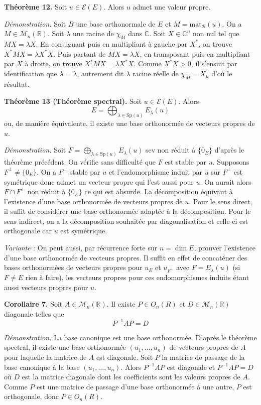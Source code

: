 \textbf{Théorème 12.} Soit $u \in \mathcal{E}(E)$. Alors $u$ admet une valeur propre.

\textit{Démonstration.} Soit $B$ une base orthonormale de $E$ et $M = \text{mat}_{\mathcal{B}}(u)$. On a $M \in \mathcal{M}_n(\mathbb{R})$. Soit $\lambda$ une racine de $\chi_M$ dans $\mathbb{C}$. Soit $X \in \mathbb{C}^n$ non nul tel que $MX = \lambda X$. En conjuguant puis en multipliant à gauche par $X^*$, on trouve $X^*MX = \lambda X^*X$. Puis partant de $MX = \lambda X$, en transposant puis en multipliant par $X$ à droite, on trouve $X^*MX = \lambda X^*X$. Comme $X^*X > 0$, il s'ensuit par identification que $\lambda = \lambda$, autrement dit $\lambda$ racine réelle de $\chi_M = X_\mu$ d'où le résultat.

\textbf{Théorème 13 (Théorème spectral).} Soit $u \in \mathcal{E}(E)$. Alors
\[
E = \bigoplus_{\lambda \in \text{Sp}(u)} E_\lambda(u)
\]
ou, de manière équivalente, il existe une base orthonormée de vecteurs propres de $u$.

\textit{Démonstration.} Soit $F = \bigoplus_{\lambda \in \text{Sp}(u)} E_\lambda(u)$ sev non réduit à $\{0_E\}$ d'après le théorème précédent. On vérifie sans difficulté que $F$ est stable par $u$. Supposons $F^\perp \neq \{0_E\}$. On a $F^\perp$ stable par $u$ et l'endomorphisme induit par $u$ sur $F^\perp$ est symétrique donc admet un vecteur propre qui l'est aussi pour $u$. On aurait alors $F \cap F^\perp$ non réduit à $\{0_E\}$ ce qui est absurde. La décomposition équivaut à l'existence d'une base orthonormée de vecteurs propres de $u$. Pour le sens direct, il suffit de considérer une base orthonormée adaptée à la décomposition. Pour le sens indirect, on a la décomposition souhaitée par diagonalisation et celle-ci est orthogonale car $u$ est symétrique.

\textit{Variante :} On peut aussi, par récurrence forte sur $n = \dim E$, prouver l'existence d'une base orthonormée de vecteurs propres. Il suffit en effet de concaténer des bases orthonormées de vecteurs propres pour $u_E$ et $u_{F^\perp}$ avec $F = E_\lambda(u)$ (si $F \neq E$ rien à faire), les vecteurs propres pour ces endomorphismes induits étant aussi vecteurs propres pour $u$.

\textbf{Corollaire 7.} Soit $A \in \mathcal{M}_n(\mathbb{R})$. Il existe $P \in O_n(R)$ et $D \in \mathcal{M}_n(\mathbb{R})$ diagonale telles que
\[
P^{-1}AP = D
\]

\textit{Démonstration.} La base canonique est une base orthonormée. D'après le théorème spectral, il existe une base orthonormée $(u_1, \dots, u_n)$ de vecteurs propres de $A$ pour laquelle la matrice de $A$ est diagonale. Soit $P$ la matrice de passage de la base canonique à la base $(u_1, \dots, u_n)$. Alors $P^{-1}AP$ est diagonale et $P^{-1}AP = D$ où $D$ est la matrice diagonale dont les coefficients sont les valeurs propres de $A$. Comme $P$ est une matrice de passage d'une base orthonormée à une autre, $P$ est orthogonale, donc $P \in O_n(R)$.

